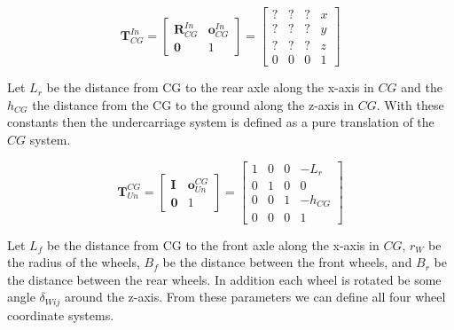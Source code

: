 \begin{equation}
  \mathbf{T}_{CG}^{In} = 
  \begin{bmatrix}
    \mathbf{R}_{CG}^{In} & \mathbf{o}_{CG}^{In} \\
    \mathbf{0} & 1
  \end{bmatrix}
  =
  \begin{bmatrix}
    ? & ? & ? & x \\
    ? & ? & ? & y \\
    ? & ? & ? & z \\
    0 & 0 & 0 & 1
  \end{bmatrix}
\end{equation}



Let $L_r$ be the distance from CG to the rear axle along the x-axis in $CG$ and the $h_{CG}$ the distance from the CG to the ground along the z-axis in $CG$. 
With these constants then the undercarriage system is defined as a pure translation of the $CG$ system.

\begin{equation}
  \mathbf{T}_{Un}^{CG} = 
  \begin{bmatrix}
    \mathbf{I} & \mathbf{o}_{Un}^{CG} \\
    \mathbf{0} & 1
  \end{bmatrix}
  =
  \begin{bmatrix}
    1 & 0 & 0 & -L_r \\
    0 & 1 & 0 & 0 \\
    0 & 0 & 1 & -h_{CG} \\
    0 & 0 & 0 & 1
  \end{bmatrix}
\end{equation}


Let $L_f$ be the distance from CG to the front axle along the x-axis in $CG$, $r_W$ be the radius of the wheels, $B_f$ be the distance between the front wheels, and $B_r$ be the distance between the rear wheels. In addition each wheel is rotated be some angle $\delta_{Wij}$ around the z-axis. From these parameters we can define all four wheel coordinate systems.


